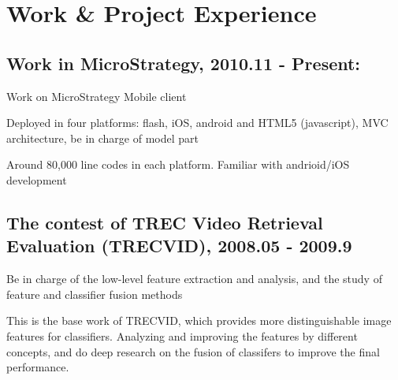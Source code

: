 \documentclass[letterpaper]{article}
\renewenvironment{itemize}{
  \begin{list}{}{
    \setlength{\leftmargin}{1.5em}
    \setlength{\itemsep}{0pt}
  }
}{
  \end{list}
}
\begin{document}

\section*{Work \& Project Experience}
\subsection*{Work in MicroStrategy, 2010.11 - Present:}
\begin{itemize}
\item Work on MicroStrategy Mobile client 
\item Deployed in four platforms: flash, iOS, android and HTML5 (javascript), MVC architecture, be in charge of model part
\item Around 80,000 line codes in each platform. Familiar with andrioid/iOS development
\end{itemize}
\subsection*{The contest of TREC Video Retrieval Evaluation (TRECVID), 2008.05 - 2009.9}
\begin{itemize}
\item Be in charge of the low-level feature extraction and analysis, and the study of feature and classifier fusion methods
\item This is the base work of TRECVID, which provides more distinguishable image features for classifiers. Analyzing and improving the features by different concepts, and do deep research on the fusion of classifers to improve the final performance. 
\end{itemize}
\end{document}

